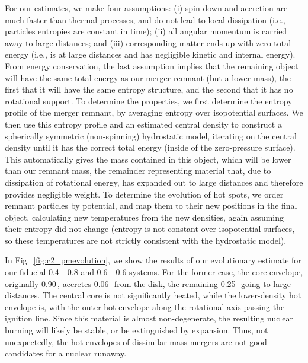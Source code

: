 For our estimates, we make four assumptions: (i) spin-down and accretion are much faster than thermal processes, and do not lead to local dissipation (i.e., particles entropies are constant in time); (ii) all angular momentum is carried away to large distances; and (iii) corresponding matter ends up with zero total energy (i.e., is at large distances and has negligible kinetic and internal energy).  From energy conservation, the last assumption implies that the remaining object will have the same total energy as our merger remnant (but a lower mass), the first that it will have the same entropy structure, and the second that it has no rotational support.  To determine the properties, we first determine the entropy profile of the merger remnant, by averaging entropy over isopotential surfaces.  We then use this entropy profile and an estimated central density to construct a spherically symmetric (non-spinning) hydrostatic model, iterating on the central density until it has the correct total energy (inside of the zero-pressure surface).  This automatically gives the mass contained in this object, which will be lower than our remnant mass, the remainder representing material that, due to dissipation of rotational energy, has expanded out to large distances and therefore provides negligible weight.  To determine the evolution of hot spots, we order remnant particles by potential, and map them to their new positions in the final object, calculating new temperatures from the new densities, again assuming their entropy did not change (entropy is not constant over isopotential surfaces, so these temperatures are not strictly consistent with the hydrostatic model).

In Fig.~\ref{fig:c2_pmevolution}, we show the results of our evolutionary estimate for our fiducial 0.4 - 0.8 and 0.6 - 0.6 {\Msun} systems.  For the former case, the core-envelope, originally 0.90\,\Msun, accretes 0.06\,\Msun\ from the disk, the remaining 0.25\,\Msun\ going to large distances.  The central core is not significantly heated, while the lower-density hot envelope is, with the outer hot envelope along the rotational axis passing the ignition line.  Since this material is almost non-degenerate, the resulting nuclear burning will likely be stable, or be extinguished by expansion.  Thus, not unexpectedly, the hot envelopes of dissimilar-mass mergers are not good candidates for a nuclear runaway.  


